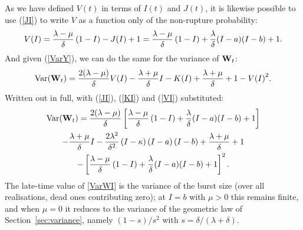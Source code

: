 As we have defined $V(t)$ in terms of $I(t)$ and $J(t)$, it is likewise
possible to use (\ref{JI}) to write $V$ as a function only of the non-rupture
probability:
\begin{equation}
\label{VI}
V(I) = \frac{\lambda - \mu}{\delta}\left(1-I\right) - J(I) + 1
= \frac{\lambda - \mu}{\delta}\left(1-I\right) + \frac{\lambda}{\delta} (I - a)(I-b) + 1.
\end{equation}
And given (\ref{VarY}), we can do the same for the variance of ${{\bf W}_t}$:
\begin{equation}
\label{VarWI}
\text{Var}({{\bf W}_t}) = \frac{2(\lambda-\mu)}{\delta} V(I) - \frac{\lambda+\mu}{\delta}I - K(I) + \frac{\lambda+\mu}{\delta} + 1 - {V(I)}^2.
\end{equation}
Written out in full, with (\ref{JI}), (\ref{KI}) and (\ref{VI}) substituted:
\begin{multline*}
\text{Var}({{\bf W}_t}) = \frac{2(\lambda - \mu)}{\delta} \left[ \frac{\lambda - \mu}{\delta}\left(1-I\right) + \frac{\lambda}{\delta} (I - a)(I-b) + 1\right] \\
- \frac{\lambda+\mu}{\delta} I
-\frac{2\lambda^2}{\delta^2}\left( I-\kappa\right)\left( I-a\right)\left( I-b\right)
+ \frac{\lambda + \mu}{\delta} + 1 \\ - \left[\frac{\lambda - \mu}{\delta}\left(1-I\right) + \frac{\lambda}{\delta} (I - a)(I-b) + 1\right]^2.
\end{multline*}
The late-time value of \eqref{VarWI} is the variance of the burst size (over
all realisations, dead ones contributing zero); at $I=b$ with $\mu>0$ this
remains finite, and when $\mu=0$ it reduces to the variance of the geometric
law of Section~\ref{sec:variance}, namely $(1-s)/s^2$ with
$s=\delta/(\lambda+\delta)$.
